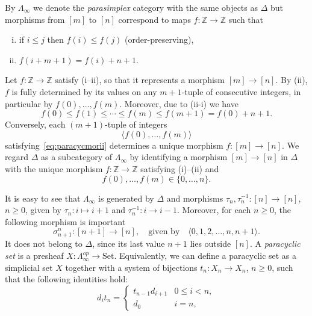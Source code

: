 \documentclass{article}
\theoremstyle{plain}
\theoremstyle{definition}
\theoremstyle{remark}
\begin{document}
  By $\Lambda_\infty$ we denote the \emph{parasimplex} category with the same objects as $\Delta$ but morphisms from $[m]$ to $[n]$ correspond to maps $f\colon\mathbb{Z}\rightarrow\mathbb{Z}$ such that
\begin{enumerate}[(i)]
    \item if $i\leq j$ then $f(i)\leq f(j)$ (order-preserving),
    \item $f(i+m+1)=f(i)+n+1$.
\end{enumerate}
Let $f\colon\mathbb{Z}\rightarrow\mathbb{Z}$ satisfy (i--ii), so that it represents a morphism $[m]\rightarrow [n]$. By (ii), $f$ is fully determined by its values on any $m+1$-tuple of consecutive integers, in particular by $f(0),\ldots,f(m)$. Moreover, due to (ii-i) we have
\begin{equation}\label{eq:paracycmorii}
    f(0)\leq f(1)\leq\cdots\leq f(m)\leq f(m+1)=f(0)+n+1.
\end{equation}
Conversely, each $(m+1)$-tuple of integers $$\langle f(0),\ldots,f(m)\rangle$$ satisfying~\eqref{eq:paracycmorii} determines a unique morphism $f\colon[m]\rightarrow [n]$.
We regard $\Delta$ as a subcategory of $\Lambda_\infty$ by identifying
a morphism $[m]\to[n]$ in $\Delta$ with the unique morphism
$f\colon\mathbb Z\to\mathbb Z$ satisfying {\rm (i)--(ii)} and
\[
f(0),\ldots,f(m)\in\{0,\ldots,n\}.
\]

It is easy to see that $\Lambda_\infty$ is generated by $\Delta$ and morphisms $\tau_n,\tau_n^{-1}\colon[n]\rightarrow [n]$, $n\geq 0$, given by $\tau_n\colon i\mapsto i+1$ and $\tau_n^{-1}\colon i \rightarrow i-1$. Moreover, for each $n\geq 0$, the following morphism is important
\begin{equation}\label{eq:seqOfDegeneracy}
    \sigma^{n}_{n+1}\colon[n+1]\rightarrow[n],\quad \text{given\ by}\quad \langle 0,1,2,\ldots,n,n+1\rangle.
\end{equation}
It does not belong to $\Delta$, since its last value $n+1$
lies outside $[n]$.
A \emph{paracyclic set} is a presheaf $X\colon\Lambda_\infty^{op}\rightarrow\mathrm{Set}$. Equivalently, we can define a paracyclic set as a simplicial set $X$ together with a system of bijections $t_n\colon X_n\rightarrow X_n$, $n\geq 0$,
such that the following identities hold:
\begin{equation}\label{eq:parBound}
    d_i t_n =
\begin{cases}
t_{n-1} d_{i+1}& 0\leq i < n,\\
d_0 & i=n,
\end{cases}
\end{equation}
\end{document}
